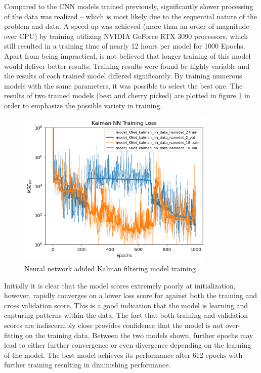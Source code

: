 \documentclass[a4paper,twoside,12pt]{report}
\begin{document}
Compared to the CNN models trained previously, significantly slower processing of the data was realized -- which is most likely due to the sequential nature of the problem and data. A speed up was achieved (more than an order of magnitude over CPU) by training utilizing NVIDIA GeForce RTX 3090 processors, which still resulted in a training time of nearly 12 hours per model for 1000 Epochs. Apart from being impractical, is not believed that longer training of this model would deliver better results. Training results were found be highly variable and the results of each trained model differed significantly. By training numerous models with the same parameters, it was possible to select the best one. The results of two trained models (best and cherry picked) are plotted in figure \ref{fig:RNNtrain} in order to emphasize the possible variety in training.

\begin{figure}[h!]
\begin{center}
\includegraphics[width=9.5cm]{images/knet_train.png}
\caption{Neural network adided Kalman filtering model training}
\label{fig:RNNtrain}
\end{center}
\end{figure}

Initially it is clear that the model scores extremely poorly at initialization, however, rapidly converges on a lower loss score for against both the training and cross validation score. This is a good indication that the model is learning and capturing patterns within the data. The fact that both training and validation scores are indiscernibly close provides confidence that the model is not over-fitting on the training data. Between the two models shown, further epochs may lead to either further convergence or even divergence depending on the learning of the model. The best model achieves its performance after 612 epochs with further training resulting in diminishing performance.
\end{document}
